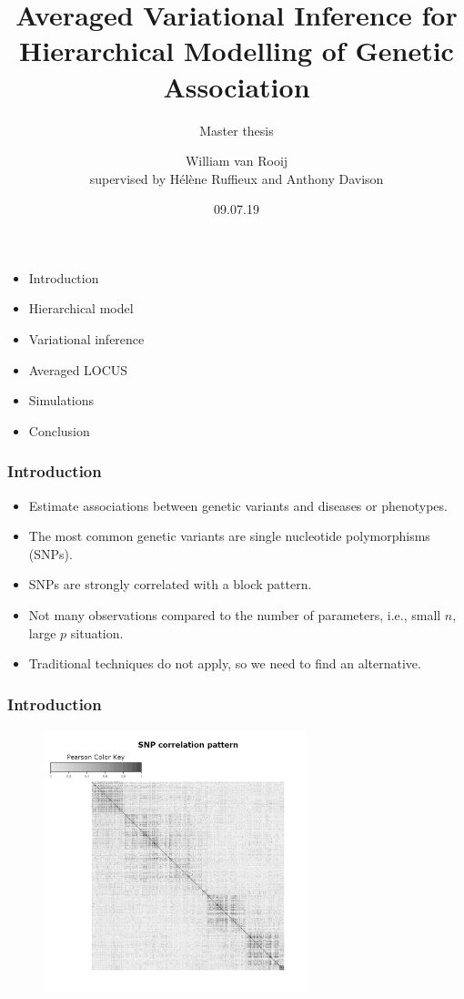 \documentclass{beamer}
\begin{document}
\SetEndCharOfAlgoLine{}

\title{Averaged Variational Inference for Hierarchical Modelling of Genetic Association}
\subtitle{Master thesis}
\author{William van Rooij\\
{\small supervised by Hélène Ruffieux and Anthony Davison}}
\date{09.07.19}
\maketitle
\begin{frame}
\begin{itemize}
\item Introduction
\item Hierarchical model
\item Variational inference
\item Averaged LOCUS
\item Simulations
\item Conclusion
\end{itemize}
\end{frame}

\begin{frame}
\frametitle{Introduction}
\begin{itemize}
\item Estimate associations between genetic variants and diseases or phenotypes.
\item The most common genetic variants are single nucleotide polymorphisms (SNPs).
\item SNPs are strongly correlated with a block pattern.
\item Not many observations compared to the number of parameters, i.e., small $n$, large $p$ situation.
\item Traditional techniques do not apply, so we need to find an alternative.
\end{itemize}
\end{frame}

\begin{frame}
\frametitle{Introduction}
\begin{figure}
\includegraphics[width=3in]{images/corrRealSNPs.pdf}
\end{figure}
\end{frame}
\end{document}
